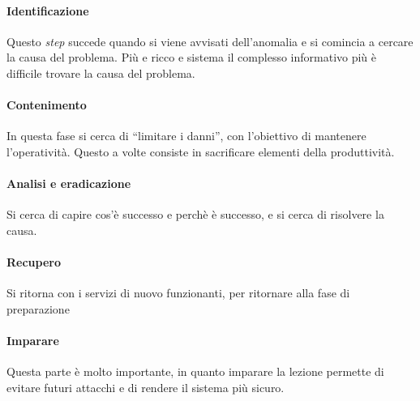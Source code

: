 \paragraph*{Identificazione} Questo \textit{step} succede quando si viene
avvisati dell'anomalia e si comincia a cercare la causa del problema. Più e
ricco e sistema il complesso informativo più è difficile trovare la causa del
problema.

\paragraph*{Contenimento} In questa fase si cerca di ``limitare i danni'', con
l'obiettivo di mantenere l'operatività. Questo a volte consiste in sacrificare
elementi della produttività.

\paragraph*{Analisi e eradicazione} Si cerca di capire cos'è successo e perchè è
successo, e si cerca di risolvere la causa.

\paragraph*{Recupero} Si ritorna con i servizi di nuovo funzionanti, per
ritornare alla fase di preparazione

\paragraph*{Imparare} Questa parte è molto importante, in quanto imparare la
lezione permette di evitare futuri attacchi e di rendere il sistema più sicuro.
